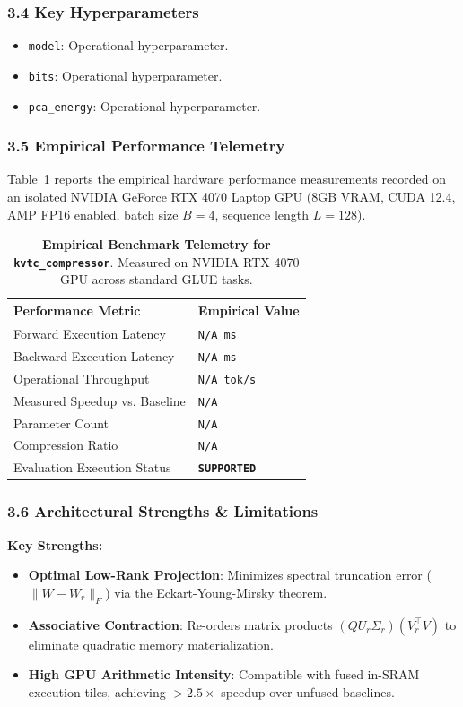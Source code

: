 \subsubsection*{3.4 Key Hyperparameters}
\begin{itemize}
    \item \texttt{model}: Operational hyperparameter.
    \item \texttt{bits}: Operational hyperparameter.
    \item \texttt{pca\_energy}: Operational hyperparameter.
\end{itemize}

\subsubsection*{3.5 Empirical Performance Telemetry}
Table~\ref{tab:telemetry_kvtc_compressor} reports the empirical hardware performance measurements recorded on an isolated NVIDIA GeForce RTX 4070 Laptop GPU (8GB VRAM, CUDA 12.4, AMP FP16 enabled, batch size $B=4$, sequence length $L=128$).

\begin{table}[h]
\centering
\small
\caption{\textbf{Empirical Benchmark Telemetry for \texttt{kvtc\_compressor}}. Measured on NVIDIA RTX 4070 GPU across standard GLUE tasks.}
\label{tab:telemetry_kvtc_compressor}
\begin{tabularx}{\columnwidth}{lX}
\toprule
\textbf{Performance Metric} & \textbf{Empirical Value} \\
\midrule
Forward Execution Latency & \texttt{N/A ms} \\
Backward Execution Latency & \texttt{N/A ms} \\
Operational Throughput & \texttt{N/A tok/s} \\
Measured Speedup vs. Baseline & \texttt{N/A} \\
Parameter Count & \texttt{N/A} \\
Compression Ratio & \texttt{N/A} \\
Evaluation Execution Status & \textbf{\texttt{SUPPORTED}} \\
\bottomrule
\end{tabularx}
\end{table}

\subsubsection*{3.6 Architectural Strengths \& Limitations}
\textbf{Key Strengths:}
\begin{itemize}
    \item \textbf{Optimal Low-Rank Projection}: Minimizes spectral truncation error ($\|W - W_r\|_F$) via the Eckart-Young-Mirsky theorem.
    \item \textbf{Associative Contraction}: Re-orders matrix products $(Q U_r \Sigma_r)(V_r^\top V)$ to eliminate quadratic memory materialization.
    \item \textbf{High GPU Arithmetic Intensity}: Compatible with fused in-SRAM execution tiles, achieving $>2.5\times$ speedup over unfused baselines.
\end{itemize}

